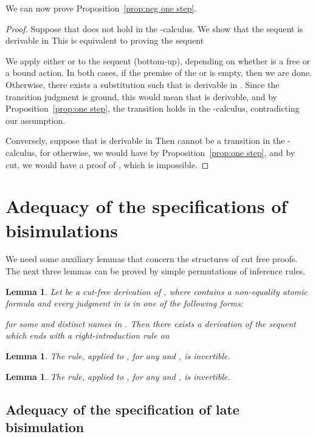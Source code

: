 \documentclass{acmtrans2m}
\newtheorem{lemma}[theorem]{Lemma}
\begin{document}
We can now prove Proposition~\ref{prop:neg one step}.


\begin{proof}
Suppose that  does not hold in the -calculus.
We show that the sequent  is 
derivable in  
This is equivalent to proving the sequent

We apply either  or  to the sequent (bottom-up), 
depending on whether  is a free or a bound action. 
In both cases, if the premise of the  or  is 
empty, then we are done. Otherwise, there exists a substitution
 such that 
is derivable in . Since the transition judgment is ground, this would
mean that  is derivable, and
by Proposition~\ref{prop:one step}, the transition  holds
in the -calculus, contradicting our assumption.

Conversely, suppose that 
is derivable in  Then  cannot be a transition
in the -calculus, for otherwise, we would have 
by Proposition~\ref{prop:one step}, and by cut, we would have a proof of , which
is impossible. 
\end{proof}



\section{Adequacy of the specifications of bisimulations}

We need some auxiliary lemmas that concern the structures of cut free proofs.
The next three lemmas can be proved by simple permutations of inference rules. 

\begin{lemma}
\label{lm:right-first}
Let  be a cut-free derivation of ,  where  
contains a non-equality atomic formula and 
every judgment in  is in one of the following forms:


for some  and distinct names  in .
Then there exists a derivation of the sequent which ends with a right-introduction rule on 
\end{lemma}

\begin{lemma}
\label{lm:lbisim-inv}
The  rule, applied to , for any  and , is
invertible. 
\end{lemma}

\begin{lemma}
\label{lm:ebisim-inv}
The  rule, applied to , for any  and , is
invertible. 
\end{lemma}

\subsection{Adequacy of the specification of late bisimulation}
\end{document}
